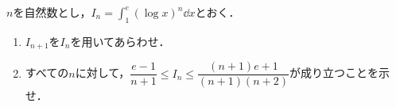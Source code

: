 $n$を自然数とし，${\displaystyle I_n=\int_{1}^{e}\left(\log x\right)^n \dd x}$とおく．
\begin{enumerate}
  \item $I_{n+1}$を$I_n$を用いてあらわせ．
  \item すべての$n$に対して，$\dfrac{e-1}{n+1}\le I_n \le \dfrac{(n+1)e+1}{(n+1)(n+2)}$が成り立つことを示せ．
\end{enumerate}